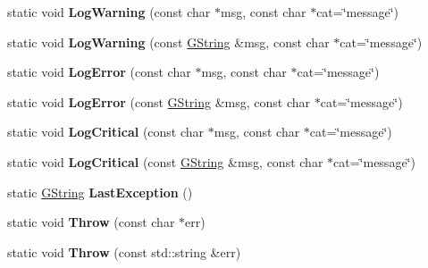 \begin{Indent}
\begin{DoxyCompactItemize}
static void {\bfseries Log\+Warning} (const char $\ast$msg, const char $\ast$cat=\char`\"{}message\char`\"{})
\item 
\mbox{\label{classrev_1_1_logger_a61d374ce7fb67b311364d4f594d17de0}} 
static void {\bfseries Log\+Warning} (const \mbox{\hyperlink{classrev_1_1_g_string}{G\+String}} \&msg, const char $\ast$cat=\char`\"{}message\char`\"{})
\item 
\mbox{\label{classrev_1_1_logger_af360e9c9027c1bbd6526477a249b9b0c}} 
static void {\bfseries Log\+Error} (const char $\ast$msg, const char $\ast$cat=\char`\"{}message\char`\"{})
\item 
\mbox{\label{classrev_1_1_logger_a9141b483abb4c7acd0690fd27ac3a9a9}} 
static void {\bfseries Log\+Error} (const \mbox{\hyperlink{classrev_1_1_g_string}{G\+String}} \&msg, const char $\ast$cat=\char`\"{}message\char`\"{})
\item 
\mbox{\label{classrev_1_1_logger_a88832774ccfc74dd83a928be65530e09}} 
static void {\bfseries Log\+Critical} (const char $\ast$msg, const char $\ast$cat=\char`\"{}message\char`\"{})
\item 
\mbox{\label{classrev_1_1_logger_a14bfd9194e96ac1a59af1bbe998c2c08}} 
static void {\bfseries Log\+Critical} (const \mbox{\hyperlink{classrev_1_1_g_string}{G\+String}} \&msg, const char $\ast$cat=\char`\"{}message\char`\"{})
\item 
\mbox{\label{classrev_1_1_logger_aec00e0d8e0d76dd5d0178bdfa1fc348a}} 
static \mbox{\hyperlink{classrev_1_1_g_string}{G\+String}} {\bfseries Last\+Exception} ()
\item 
\mbox{\label{classrev_1_1_logger_af6e8ae2e82df64a3a874604ae0254c62}} 
static void {\bfseries Throw} (const char $\ast$err)
\item 
\mbox{\label{classrev_1_1_logger_abc250d5efb5727ae05dbdcadfdb806c3}} 
static void {\bfseries Throw} (const std\+::string \&err)
\item 
\mbox{\label{classrev_1_1_logger_a2abd8d150544bbde0227fe5c1f8bd8eb}} 

\end{DoxyCompactItemize}
\end{Indent}
